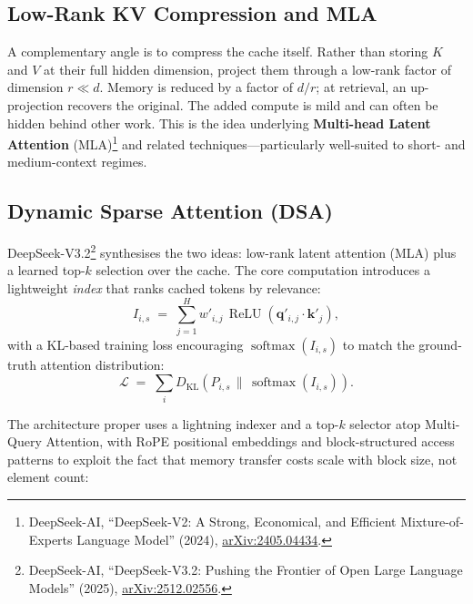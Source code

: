 \documentclass[11pt,a4paper]{article}
\theoremstyle{definition}
\theoremstyle{remark}
\theoremstyle{plain}
\newcommand{\KL}{D_{\mathrm{KL}}}
\newcommand{\arxivlink}[1]{\href{https://arxiv.org/abs/#1}{arXiv:#1}}
\begin{document}
\subsection{Low-Rank KV Compression and MLA}

A complementary angle is to compress the cache itself. Rather than storing
$K$ and $V$ at their full hidden dimension, project them through a
low-rank factor of dimension $r \ll d$. Memory is reduced by a factor of
$d/r$; at retrieval, an up-projection recovers the original. The added
compute is mild and can often be hidden behind other work. This is the
idea underlying \textbf{Multi-head Latent Attention}
(MLA)\footnote{DeepSeek-AI, ``DeepSeek-V2: A Strong, Economical, and
Efficient Mixture-of-Experts Language Model'' (2024),
\arxivlink{2405.04434}.} and related techniques---particularly
well-suited to short- and medium-context regimes.

\subsection{Dynamic Sparse Attention (DSA)}

DeepSeek-V3.2\footnote{DeepSeek-AI, ``DeepSeek-V3.2: Pushing the Frontier
of Open Large Language Models'' (2025), \arxivlink{2512.02556}.}
synthesises the two ideas: low-rank latent attention (MLA) plus a learned
top-$k$ selection over the cache. The core computation introduces a
lightweight \emph{index} that ranks cached tokens by relevance:
\begin{equation}
  I_{i,s} \;=\; \sum_{j=1}^{H} w'_{i,j}\, \operatorname{ReLU}(\mathbf{q}'_{i,j} \cdot \mathbf{k}'_j),
\end{equation}
with a KL-based training loss encouraging $\operatorname{softmax}(I_{i,s})$
to match the ground-truth attention distribution:
\begin{equation}
  \mathcal{L} \;=\; \sum_i \KL\!\left(P_{i,s} \,\big\|\, \operatorname{softmax}(I_{i,s})\right).
\end{equation}

The architecture proper uses a lightning indexer and a top-$k$ selector
atop Multi-Query Attention, with RoPE positional embeddings and
block-structured access patterns to exploit the fact that memory transfer
costs scale with block size, not element count:
\end{document}
